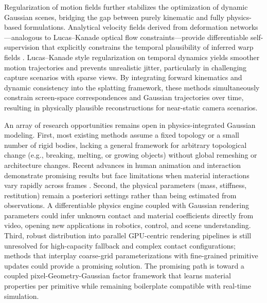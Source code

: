 \documentclass[11pt,a4paper]{article}
\begin{document}
Regularization of motion fields further stabilizes the optimization of dynamic Gaussian scenes, bridging the gap between purely kinematic and fully physics-based formulations. Analytical velocity fields derived from deformation networks---analogous to Lucas--Kanade optical flow constraints---provide differentiable self-supervision that explicitly constrains the temporal plausibility of inferred warp fields \cite{arxiv:2407.11309v1}. Lucas--Kanade style regularization on temporal dynamics yields smoother motion trajectories and prevents unrealistic jitter, particularly in challenging capture scenarios with sparse views. By integrating forward kinematics and dynamic consistency into the splatting framework, these methods simultaneously constrain screen-space correspondences and Gaussian trajectories over time, resulting in physically plausible reconstructions for near-static camera scenarios.

An array of research opportunities remains open in physics-integrated Gaussian modeling. First, most existing methods assume a fixed topology or a small number of rigid bodies, lacking a general framework for arbitrary topological change (e.g., breaking, melting, or growing objects) without global remeshing or architecture changes. Recent advances in human animation and interaction demonstrate promising results but face limitations when material interactions vary rapidly across frames \cite{arxiv:2511.09827v2}. Second, the physical parameters (mass, stiffness, restitution) remain a posteriori settings rather than being estimated from observations. A differentiable physics engine coupled with Gaussian rendering parameters could infer unknown contact and material coefficients directly from video, opening new applications in robotics, control, and scene understanding. Third, robust distribution into parallel GPU-centric rendering pipelines is still unresolved for high-capacity fallback and complex contact configurations; methods that interplay coarse-grid parameterizations with fine-grained primitive updates could provide a promising solution. The promising path is toward a coupled pixel-Geometry-Gaussian factor framework that learns material properties per primitive while remaining boilerplate compatible with real-time simulation.
\end{document}

